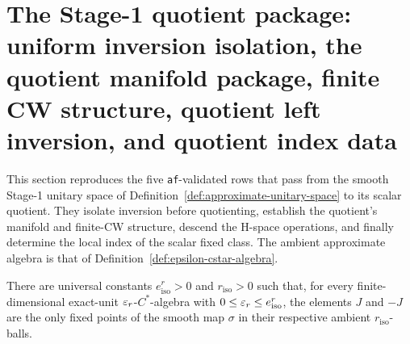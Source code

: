 \section{The Stage-1 quotient package: uniform inversion isolation, the quotient manifold package, finite CW structure, quotient left inversion, and quotient index data}\label{sec:stage1-quotient-package}

This section reproduces the five \texttt{af}-validated rows that pass from the smooth
Stage-1 unitary space of Definition~\ref{def:approximate-unitary-space} to its scalar
quotient.  They isolate inversion before quotienting, establish the quotient's manifold
and finite-CW structure, descend the H-space operations, and finally determine the local
index of the scalar fixed class.  The ambient approximate algebra is that of
Definition~\ref{def:epsilon-cstar-algebra}.

\begin{lemma}\label{lem:stage1-uniform-inversion-isolation}
There are universal constants $e^{r}_{\mathrm{iso}}>0$ and $r_{\mathrm{iso}}>0$ such
that, for every finite-dimensional exact-unit $\varepsilon_r$-$C^{*}$-algebra with
$0\le \varepsilon_r\le e^{r}_{\mathrm{iso}}$, the elements $J$ and $-J$ are the only fixed
points of the smooth map $\sigma$ in their respective ambient $r_{\mathrm{iso}}$-balls.
\end{lemma}

